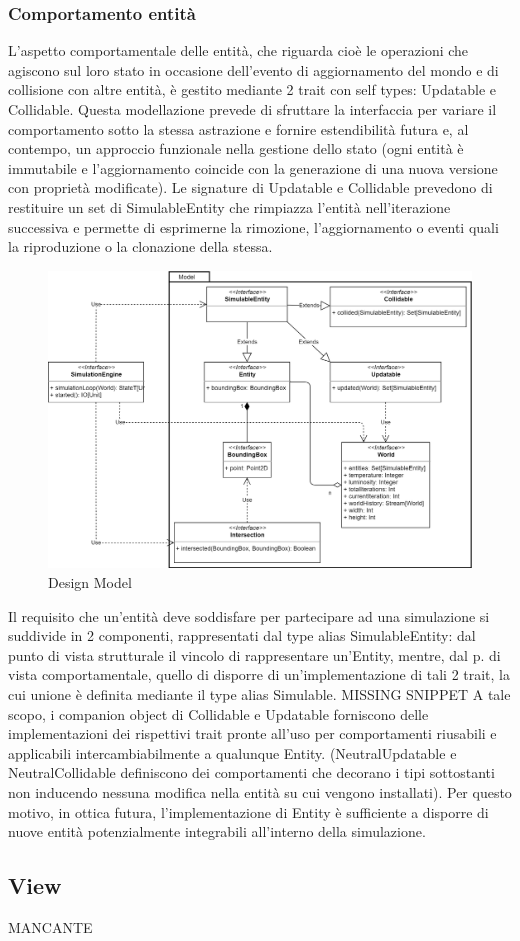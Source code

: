 \subsubsection{Comportamento entità}
L’aspetto comportamentale delle entità, che riguarda cioè le operazioni che agiscono sul loro stato in occasione dell’evento di aggiornamento del mondo e di collisione con altre entità, è gestito mediante 2 trait con self types: Updatable e Collidable. Questa modellazione prevede di sfruttare la interfaccia per variare il comportamento sotto la stessa astrazione e fornire estendibilità futura e, al contempo, un approccio funzionale nella gestione dello stato (ogni entità è immutabile e l’aggiornamento coincide con la generazione di una nuova versione con proprietà modificate). Le signature di Updatable e Collidable prevedono di restituire un set di SimulableEntity che rimpiazza l’entità nell’iterazione successiva e permette di esprimerne la rimozione, l’aggiornamento o eventi quali la riproduzione o la clonazione della stessa.
\begin{figure}[h!]
\centering
\includegraphics[width=\textwidth, scale=0.44]{img/Model.png}
\caption{Design Model}
\label{fig:model}
\end{figure}
Il requisito che un’entità deve soddisfare per partecipare ad una simulazione si suddivide in 2 componenti, rappresentati dal type alias SimulableEntity: dal punto di vista strutturale il vincolo di rappresentare un’Entity, mentre, dal p. di vista comportamentale, quello di disporre di un’implementazione di tali 2 trait, la cui unione è definita mediante il type alias Simulable. 
MISSING SNIPPET
A tale scopo, i companion object di Collidable e Updatable forniscono delle implementazioni dei rispettivi trait pronte all’uso per comportamenti riusabili e applicabili intercambiabilmente a qualunque Entity. (NeutralUpdatable e NeutralCollidable definiscono dei comportamenti che decorano i tipi sottostanti non inducendo nessuna modifica nella entità su cui vengono installati). Per questo motivo, in ottica futura, l’implementazione di Entity è sufficiente a disporre di nuove entità potenzialmente integrabili all’interno della simulazione.


\subsection{View}

MANCANTE


